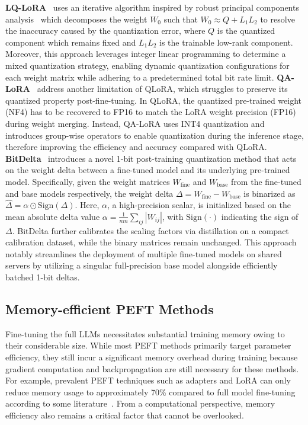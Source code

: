 \textbf{LQ-LoRA}~\cite{guo2023lq} uses an iterative algorithm inspired by robust principal components analysis~\cite{zhou2011godec, wright2009robust} which decomposes the weight $W_0$ such that $W_0 \approx Q + L_1L_2$ to resolve the inaccuracy caused by the quantization error, where $Q$ is the quantized component which remains fixed and $L_1L_2$ is the trainable low-rank component. 
Moreover, this approach leverages integer linear programming to determine a mixed quantization strategy, enabling dynamic quantization configurations for each weight matrix while adhering to a predetermined total bit rate limit.
\textbf{QA-LoRA}~\cite{xu2023qa} address another limitation of QLoRA, which struggles to preserve its quantized property post-fine-tuning. In QLoRA, the quantized pre-trained weight (NF4) has to be recovered to FP16 to match the LoRA weight precision (FP16) during weight merging. Instead, QA-LoRA uses INT4 quantization and introduces group-wise operators to enable quantization during the inference stage, therefore improving the efficiency and accuracy compared with QLoRA. 
\textbf{BitDelta}~\cite{liu2024bitdelta} introduces a novel 1-bit post-training quantization method that acts on the weight delta between a fine-tuned model and its underlying pre-trained model. Specifically, given the weight matrices $W_{\text{fine}}$ and $W_{\text{base}}$ from the fine-tuned and base models respectively, the weight delta $\Delta = W_{\text{fine}} - W_{\text{base}}$ is binarized as $\hat{\Delta} = \alpha \odot \text{Sign}(\Delta)$. Here, $\alpha$, a high-precision scalar, is initialized based on the mean absolute delta value $\alpha = \frac{1}{nm} \sum_{ij} |W_{ij}|$, with $\text{Sign}(\cdot)$ indicating the sign of $\Delta$. BitDelta further calibrates the scaling factors via distillation on a compact calibration dataset, while the binary matrices remain unchanged. This approach notably streamlines the deployment of multiple fine-tuned models on shared servers by utilizing a singular full-precision base model alongside efficiently batched 1-bit deltas.


\subsection{Memory-efficient PEFT Methods}
\label{memory_peft}
Fine-tuning the full LLMs necessitates substantial training memory owing to their considerable size. While most PEFT methods primarily target parameter efficiency, they still incur a significant memory overhead during training because gradient computation and backpropagation are still necessary for these methods. For example, prevalent PEFT techniques such as adapters and LoRA can only reduce memory usage to approximately 70\% compared to full model fine-tuning according to some literature~\cite{lst, jin2023parameter}. From a computational perspective, memory efficiency also remains a critical factor that cannot be overlooked.



